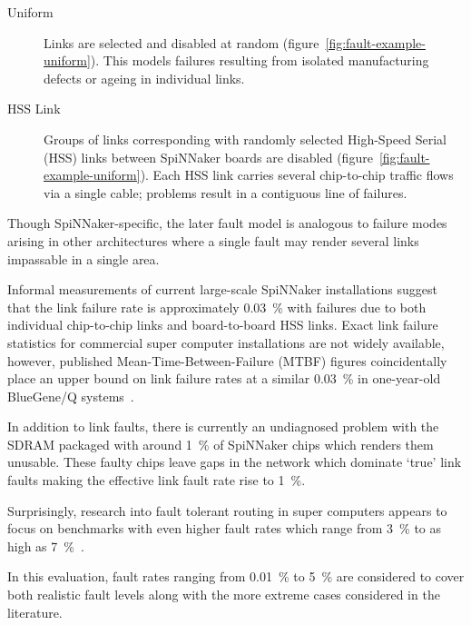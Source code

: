 			\begin{description}
				
				\item[Uniform] Links are selected and disabled at random
				(figure~\ref{fig:fault-example-uniform}). This models failures
				resulting from isolated manufacturing defects or ageing in individual
				links.
				
				\item[HSS Link] Groups of links corresponding with randomly selected
				High-Speed Serial (HSS) links between SpiNNaker boards are disabled
				(figure~\ref{fig:fault-example-uniform}). Each HSS link carries several
				chip-to-chip traffic flows via a single cable; problems result in a
				contiguous line of failures.
				
			\end{description}
			
			Though SpiNNaker-specific, the later fault model is analogous to failure
			modes arising in other architectures where a single fault may render
			several links impassable in a single area.
			
			Informal measurements of current large-scale SpiNNaker installations
			suggest that the link failure rate is approximately \SI{0.03}{\percent}
			with failures due to both individual chip-to-chip links and
			board-to-board HSS links. Exact link failure statistics for commercial
			super computer installations are not widely available, however, published
			Mean-Time-Between-Failure (MTBF) figures coincidentally place an upper
			bound on link failure rates at a similar \SI{0.03}{\percent} in
			one-year-old BlueGene/Q systems~\cite{chiu11}.
			
			In addition to link faults, there is currently an undiagnosed problem
			with the SDRAM packaged with around \SI{1}{\percent} of SpiNNaker chips
			which renders them unusable. These faulty chips leave gaps in the network
			which dominate `true' link faults making the effective link fault rate
			rise to \SI{1}{\percent}.
			
			Surprisingly, research into fault tolerant routing in super computers
			appears to focus on benchmarks with even higher fault rates which range
			from \SI{3}{\percent} to as high as
			\SI{7}{\percent}~\cite{ho04,gomez04,mejia06}.
			
			In this evaluation, fault rates ranging from \SI{0.01}{\percent} to
			\SI{5}{\percent} are considered to cover both realistic fault levels
			along with the more extreme cases considered in the literature.
		
